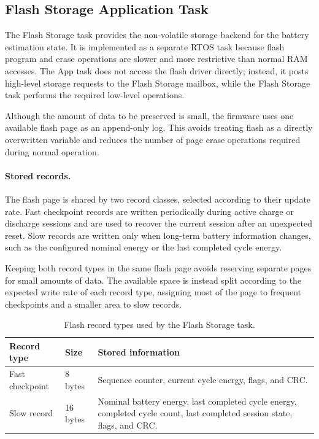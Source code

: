 \subsection{Flash Storage Application Task}

The Flash Storage task provides the non-volatile storage backend for the battery estimation state. It is implemented as a separate RTOS task because flash program and erase operations are slower and more restrictive than normal RAM accesses. The App task does not access the flash driver directly; instead, it posts high-level storage requests to the Flash Storage mailbox, while the Flash Storage task performs the required low-level operations.

Although the amount of data to be preserved is small, the firmware uses one available flash page as an append-only log. This avoids treating flash as a directly overwritten variable and reduces the number of page erase operations required during normal operation.

\paragraph{Stored records.}
The flash page is shared by two record classes, selected according to their update rate. Fast checkpoint records are written periodically during active charge or discharge sessions and are used to recover the current session after an unexpected reset. Slow records are written only when long-term battery information changes, such as the configured nominal energy or the last completed cycle energy.

Keeping both record types in the same flash page avoids reserving separate pages for small amounts of data. The available space is instead split according to the expected write rate of each record type, assigning most of the page to frequent checkpoints and a smaller area to slow records.

\begin{table}[H]
	\centering
	\small
	\caption{Flash record types used by the Flash Storage task.}
	\label{tab:flash_record_types}
	\begin{tabularx}{\textwidth}{l l X}
		\toprule
		\textbf{Record type} & \textbf{Size} & \textbf{Stored information} \\
		\midrule
		Fast checkpoint &
		8 bytes &
		Sequence counter, current cycle energy, flags, and CRC. \\
		
		Slow record &
		16 bytes &
		Nominal battery energy, last completed cycle energy, completed cycle count, last completed session state, flags, and CRC. \\
		\bottomrule
	\end{tabularx}
\end{table}


